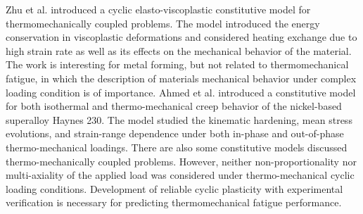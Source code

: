 Zhu et al. \cite{ZHU2016} introduced a cyclic elasto-viscoplastic constitutive model for thermomechanically coupled problems. The model introduced the energy conservation in viscoplastic deformations and considered heating exchange due to high strain rate as well as its effects on the mechanical behavior of the material. The work is interesting for metal forming, but not related to thermomechanical fatigue, in which the description of materials mechanical behavior under complex loading condition is of importance.
Ahmed et al. \cite{Ahmed2016,Ahmed2017} introduced a constitutive model for both isothermal and thermo-mechanical creep behavior of the nickel-based superalloy Haynes 230. The model studied the kinematic hardening, mean stress evolutions, and strain-range dependence under both in-phase and out-of-phase thermo-mechanical loadings.
There are also some constitutive models \cite{Mao2015,Nieto-Fuentes2018,Wang2017} discussed thermo-mechanically coupled problems.
However, neither non-proportionality nor multi-axiality of the applied load was considered under thermo-mechanical cyclic loading conditions.
Development of reliable cyclic plasticity with experimental verification is necessary for predicting thermomechanical fatigue performance.



